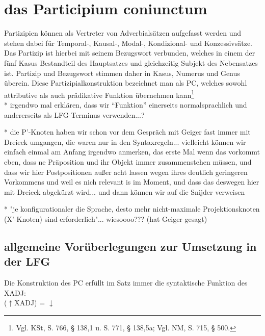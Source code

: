 \documentclass[12pt,a4paper]{article}
\begin{document}
\section{das Participium coniunctum}
Partizipien können als Vertreter von Adverbialsätzen aufgefasst werden und stehen dabei für Temporal-, Kausal-, Modal-, Kondizional- und Konzessivsätze. Das Partizip ist hierbei mit seinem Bezugswort verbunden, welches in einem der fünf Kasus Bestandteil des Hauptsatzes und gleichzeitig Subjekt des Nebensatzes ist. Partizip und Bezugswort stimmen daher in Kasus, Numerus und Genus überein. Diese Partizipialkonstruktion bezeichnet man als PC, welches sowohl attributive als auch prädikative Funktion übernehmen kann\footnote{Vgl. KSt, S. 766, § 138,1 u. S. 771, § 138,5a; Vgl. NM, S. 715, § 500.} \\
* irgendwo mal erklären, dass wir ``Funktion'' einerseits normalsprachlich und andererseits als LFG-Terminus verwenden...?

* die P'-Knoten haben wir schon vor dem Gespräch mit Geiger fast immer mit Dreieck umgangen, die waren nur in den Syntaxregeln... vielleicht können wir einfach einmal am Anfang irgendwo anmerken, das erste Mal wenn das vorkommt eben, dass ne Präposition und ihr Objekt immer zusammenstehen müssen, und dass wir hier Postpositionen außer acht lassen wegen ihres deutlich geringeren Vorkommens und weil es nich relevant is im Moment, und dass das deswegen hier mit Dreieck abgekürzt wird... und dann können wir auf die Snijder verweisen

* "je konfigurationaler die Sprache, desto mehr nicht-maximale Projektionsknoten (X'-Knoten) sind erforderlich"... wiesoooo??? (hat Geiger gesagt)

\subsection{allgemeine Vorüberlegungen zur Umsetzung in der LFG}
Die Konstruktion des PC erfüllt im Satz immer die syntaktische Funktion des XADJ: \\ 
($\uparrow$XADJ) = $\downarrow$ \\

\end{document}
